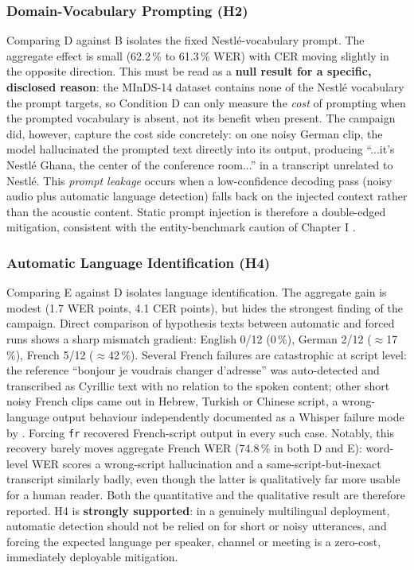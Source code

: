 \documentclass[12pt]{report}
\begin{document}
\subsubsection{Domain-Vocabulary Prompting (H2)}
Comparing D against B isolates the fixed Nestl\'e-vocabulary prompt. The aggregate effect is small (62.2\,\% to 61.3\,\% WER) with CER moving slightly in the opposite direction. This must be read as a \textbf{null result for a specific, disclosed reason}: the MInDS-14 dataset contains none of the Nestl\'e vocabulary the prompt targets, so Condition D can only measure the \emph{cost} of prompting when the prompted vocabulary is absent, not its benefit when present. The campaign did, however, capture the cost side concretely: on one noisy German clip, the model hallucinated the prompted text directly into its output, producing \enquote{...it's Nestl\'e Ghana, the center of the conference room...} in a transcript unrelated to Nestl\'e. This \emph{prompt leakage} occurs when a low-confidence decoding pass (noisy audio plus automatic language detection) falls back on the injected context rather than the acoustic content. Static prompt injection is therefore a double-edged mitigation, consistent with the entity-benchmark caution of Chapter I \cite{durmus2026contextual}.
\subsubsection{Automatic Language Identification (H4)}
Comparing E against D isolates language identification. The aggregate gain is modest (1.7 WER points, 4.1 CER points), but hides the strongest finding of the campaign. Direct comparison of hypothesis texts between automatic and forced runs shows a sharp mismatch gradient: English 0/12 (0\,\%), German 2/12 ($\approx$17\,\%), French 5/12 ($\approx$42\,\%). Several French failures are catastrophic at script level: the reference \enquote{bonjour je voudrais changer d'adresse} was auto-detected and transcribed as Cyrillic text with no relation to the spoken content; other short noisy French clips came out in Hebrew, Turkish or Chinese script, a wrong-language output behaviour independently documented as a Whisper failure mode by \cite{koenecke2024careless}. Forcing \texttt{fr} recovered French-script output in every such case. Notably, this recovery barely moves aggregate French WER (74.8\,\% in both D and E): word-level WER scores a wrong-script hallucination and a same-script-but-inexact transcript similarly badly, even though the latter is qualitatively far more usable for a human reader. Both the quantitative and the qualitative result are therefore reported. H4 is \textbf{strongly supported}: in a genuinely multilingual deployment, automatic detection should not be relied on for short or noisy utterances, and forcing the expected language per speaker, channel or meeting is a zero-cost, immediately deployable mitigation.
\end{document}
